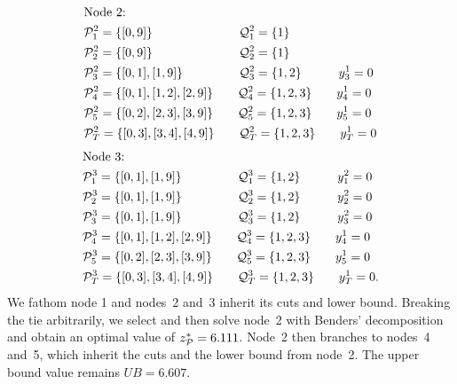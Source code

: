 \documentclass[11pt]{article}
\newcommand{\cQ}{{\cal Q}}
\newcommand{\cP}{{\cal P}}
\begin{document}
 	\begin{align*}
 	    & \text{Node 2:}\\
	    &\cP_1^2 = \{[0,9]\} \qquad \qquad \qquad \quad \cQ_1^2 = \{1\}\\
	    &\cP_2^2 = \{[0,9]\} \qquad \qquad \qquad \quad \cQ_2^2 = \{1\}\\
	    &\cP_3^2 = \{[0,1],[1,9]\} \qquad \qquad \;\; \cQ_3^2 = \{1,2\} \qquad \quad  y_3^1 = 0\\
	    &\cP_4^2 = \{[0,1],[1,2],[2,9]\} \qquad  \cQ_4^2 = \{1,2,3\} \qquad y_4^1 = 0\\
	    &\cP_5^2 = \{[0,2],[2,3],[3,9]\} \qquad  \cQ_5^2 = \{1,2,3\} \qquad y_5^1 = 0\\
	    &\cP_T^2 = \{[0,3],[3,4],[4,9]\} \qquad  \cQ_T^2 = \{1,2,3\} \qquad y_T^1 = 0
	\end{align*}
	\begin{align*}
 	    & \text{Node 3:}\\
	    &\cP_1^3 = \{[0,1],[1,9]\} \qquad \qquad \;\; \cQ_1^3 = \{1,2\} \qquad \quad y_1^2 = 0\\
	    &\cP_2^3 = \{[0,1],[1,9]\} \qquad \qquad \;\; \cQ_2^3 = \{1,2\} \qquad \quad y_2^2 = 0\\
	    &\cP_3^3 = \{[0,1],[1,9]\} \qquad \qquad \;\; \cQ_3^3 = \{1,2\} \qquad \quad y_3^2 = 0\\
	    &\cP_4^3 = \{[0,1],[1,2],[2,9]\} \qquad  \cQ_4^3 = \{1,2,3\} \qquad y_4^1 = 0\\
	    &\cP_5^3 = \{[0,2],[2,3],[3,9]\} \qquad  \cQ_5^3 = \{1,2,3\} \qquad y_5^1 = 0\\
	    &\cP_T^3 = \{[0,3],[3,4],[4,9]\} \qquad  \cQ_T^3 = \{1,2,3\} \qquad y_T^1 = 0.
	\end{align*}
	We fathom node 1 and nodes~2 and~3 inherit its cuts and lower bound. Breaking the tie arbitrarily, we select and then solve node~2 with Benders' decomposition and obtain an optimal value of $z^*_{\cP} = 6.111$. Node~2 then branches to nodes~4 and~5, which inherit the cuts and the lower bound from node~2. The upper bound value remains $UB=6.607$.
\end{document}
